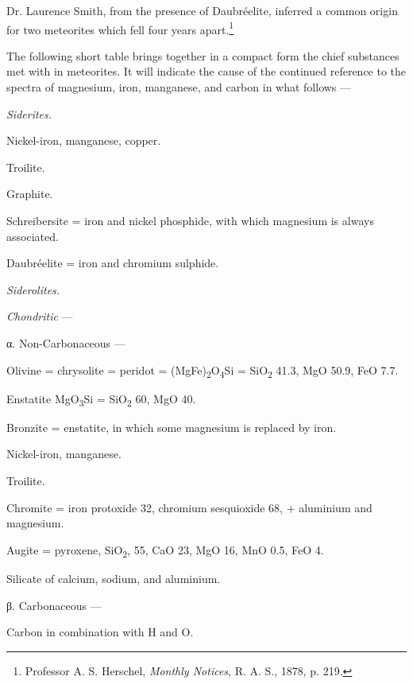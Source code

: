 \documentclass[a4paper, 12pt, oneside, polutonikogreek, english]{article}
\begin{document}
Dr. Laurence Smith, from the presence of Daubréelite, inferred a common origin for two meteorites which fell four years apart.\footnote{Professor A. S. Herschel, \emph{Monthly Notices}, R. A. S., 1878, p. 219.}

The following short table brings together in a compact form the chief substances met with in meteorites. It will indicate the cause of the continued reference to the spectra of magnesium, iron, manganese, and carbon in what follows ---
\begin{center}
\emph{Siderites.}
\end{center}

Nickel-iron, manganese, copper.

Troilite.

Graphite.

Schreibersite = iron and nickel phosphide, with which magnesium is always associated.

Daubréelite = iron and chromium sulphide.

\begin{center}
\emph{Siderolites.}
\end{center}

\emph{Chondritic} ---

\vspace{5mm}

α. Non-Carbonaceous ---

\vspace{2mm}

Olivine = chrysolite = peridot = (MgFe)\textsubscript{2}O\textsubscript{4}Si = SiO\textsubscript{2} 41.3, MgO 50.9, FeO 7.7.

Enstatite MgO\textsubscript{3}Si = SiO\textsubscript{2} 60, MgO 40.

Bronzite = enstatite, in which some magnesium is replaced by iron.

Nickel-iron, manganese.

Troilite.

Chromite = iron protoxide 32, chromium sesquioxide 68, + aluminium and magnesium.

Augite = pyroxene, SiO\textsubscript{2}, 55, CaO 23, MgO 16, MnO 0.5, FeO 4.

Silicate of calcium, sodium, and aluminium.

\vspace{5mm}

β. Carbonaceous ---

\vspace{2mm}

Carbon in combination with H and O.
\end{document}

